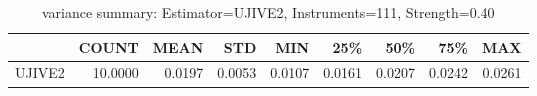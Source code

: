 \begin{table}[ht]
\centering
\caption{variance summary: Estimator=UJIVE2, Instruments=111, Strength=0.40}
\begin{tabular}{lrrrrrrrr}
\toprule
 & COUNT & MEAN & STD & MIN & 25\% & 50\% & 75\% & MAX \\
\midrule
UJIVE2 & 10.0000 & 0.0197 & 0.0053 & 0.0107 & 0.0161 & 0.0207 & 0.0242 & 0.0261 \\
\bottomrule
\end{tabular}
\end{table}
